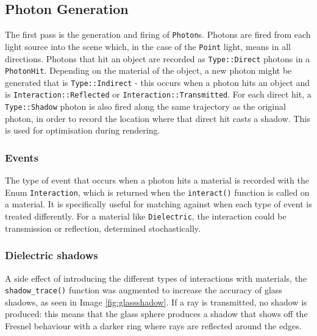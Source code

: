 \documentclass[a4paper]{article}
\begin{document}
\subsection{Photon Generation}
The first pass is the generation and firing of \texttt{Photon}s. Photons are fired from each light source into the scene which, in the case of the \texttt{Point} light, means in all directions. Photons that hit an object are recorded as \texttt{Type::Direct} photons in a \texttt{PhotonHit}. Depending on the material of the object, a new photon might be generated that is \texttt{Type::Indirect} - this occurs when a photon hits an object and is \texttt{Interaction::Reflected} or \texttt{Interaction::Transmitted}. For each direct hit, a \texttt{Type::Shadow} photon is also fired along the same trajectory as the original photon, in order to record the location where that direct hit casts a shadow. This is used for optimisation during rendering.

\subsubsection{Events}
The type of event that occurs when a photon hits a material is recorded with the Enum \texttt{Interaction}, which is returned when the \texttt{interact()} function is called on a material. It is specifically useful for matching against when each type of event is treated differently. For a material like \texttt{Dielectric}, the interaction could be transmission or reflection, determined stochastically.

\subsubsection{Dielectric shadows}
A side effect of introducing the different types of interactions with materials, the \texttt{shadow\_trace()} function was augmented to increase the accuracy of glass shadows, as seen in Image \ref{fig:glassshadow}. If a ray is transmitted, no shadow is produced: this means that the glass sphere produces a shadow that shows off the Fresnel behaviour with a darker ring where rays are reflected around the edges.
\end{document}
